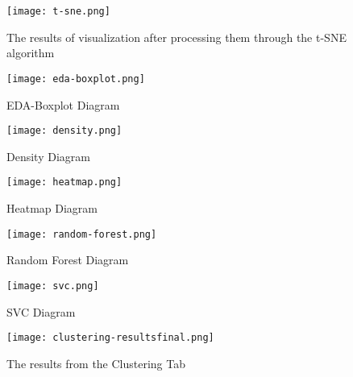 \documentclass[unnumsec,webpdf,contemporary,large]{oup-authoring-template}%
\theoremstyle{thmstyleone}%
\theoremstyle{thmstyletwo}%
\theoremstyle{thmstylethree}%
\begin{document}
\begin{figure}
    \centering
    \texttt{[image: t-sne.png]}
    \caption{The results of visualization after processing them through the t-SNE algorithm}
    \label{fig:t-sne}
\end{figure}

\begin{figure}
    \centering
    \texttt{[image: eda-boxplot.png]}
    \caption{EDA-Boxplot Diagram}
    \label{fig:eda-boxplot}
\end{figure}

\begin{figure}
    \centering
    \texttt{[image: density.png]}
    \caption{Density Diagram}
    \label{fig:density}
\end{figure}

\begin{figure}
    \centering
    \texttt{[image: heatmap.png]}
    \caption{Heatmap Diagram}
    \label{fig:heatmap}
\end{figure}

\begin{figure}
    \centering
    \texttt{[image: random-forest.png]}
    \caption{Random Forest Diagram}
    \label{fig:random-forest}
\end{figure}

\begin{figure}
    \centering
    \texttt{[image: svc.png]}
    \caption{SVC Diagram}
    \label{fig:svc}
\end{figure}

\begin{figure}
    \centering
    \texttt{[image: clustering-resultsfinal.png]}
    \caption{The results from the Clustering Tab}
    \label{fig:clustering-results}
\end{figure}
\end{document}
